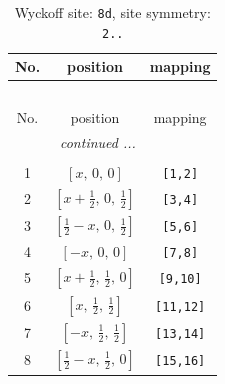 \documentclass[fleqn,8pt]{jsarticle}
\begin{document}
\begin{longtable}{ccc}
\caption{Wyckoff site: {\tt 8d}, site symmetry: {\tt 2..}}
 \\
 \hline \hline
No. & position & mapping \\ \hline \endfirsthead

\multicolumn{2}{l}{\tablename\ \thetable{}} \\
 \hline \hline
No. & position & mapping \\ \hline \endhead

 \hline \hline
\multicolumn{2}{r}{\footnotesize\it continued ...} \\ \endfoot

 \hline \hline
\multicolumn{2}{r}{} \\ \endlastfoot

1 & $\left[ x,\, 0,\, 0 \right]$ & {\tt [1,2]} \\ \hline
2 & $\left[ x + \frac{1}{2},\, 0,\, \frac{1}{2} \right]$ & {\tt [3,4]} \\ \hline
3 & $\left[ \frac{1}{2} - x,\, 0,\, \frac{1}{2} \right]$ & {\tt [5,6]} \\ \hline
4 & $\left[ - x,\, 0,\, 0 \right]$ & {\tt [7,8]} \\ \hline
5 & $\left[ x + \frac{1}{2},\, \frac{1}{2},\, 0 \right]$ & {\tt [9,10]} \\ \hline
6 & $\left[ x,\, \frac{1}{2},\, \frac{1}{2} \right]$ & {\tt [11,12]} \\ \hline
7 & $\left[ - x,\, \frac{1}{2},\, \frac{1}{2} \right]$ & {\tt [13,14]} \\ \hline
8 & $\left[ \frac{1}{2} - x,\, \frac{1}{2},\, 0 \right]$ & {\tt [15,16]} \\
\end{longtable}
\renewcommand{\arraystretch}{1.2}
\end{document}
